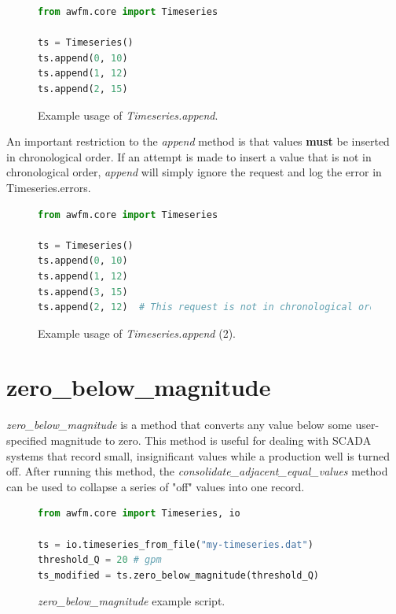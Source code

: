 \documentclass{tufte-book} %
\begin{document}
\begin{figure}[h]
\begin{lstlisting}[language=python]
from awfm.core import Timeseries

ts = Timeseries()
ts.append(0, 10)
ts.append(1, 12)
ts.append(2, 15)
\end{lstlisting}
\caption{Example usage of \emph{Timeseries.append}.}
\end{figure}

An important restriction to the \emph{append} method is that values
\textbf{must} be inserted in chronological order. If an attempt is made
to insert a value that is not in chronological order, \emph{append} will
simply ignore the request and log the error in Timeseries.errors.

\begin{figure}[h]
\begin{lstlisting}[language=python]
from awfm.core import Timeseries

ts = Timeseries()
ts.append(0, 10)
ts.append(1, 12)
ts.append(3, 15)
ts.append(2, 12)  # This request is not in chronological order and will be ignored.
\end{lstlisting}
\caption{Example usage of \emph{Timeseries.append} (2).}
\end{figure}


\section{zero\_below\_magnitude}

\emph{zero\_below\_magnitude} is a method that converts
any value below some user-specified magnitude to zero. 
This method is useful for dealing with SCADA systems that record
small, insignificant values while a production well is turned off. 
After running this method, the \emph{consolidate\_adjacent\_equal\_values} method
can be used to collapse a series of "off" values into one record.

\begin{figure}[h]
\begin{lstlisting}[language=python]
from awfm.core import Timeseries, io

ts = io.timeseries_from_file("my-timeseries.dat")
threshold_Q = 20 # gpm
ts_modified = ts.zero_below_magnitude(threshold_Q)
\end{lstlisting}
\caption{\emph{zero\_below\_magnitude} example script.}
\end{figure}
\end{document}
